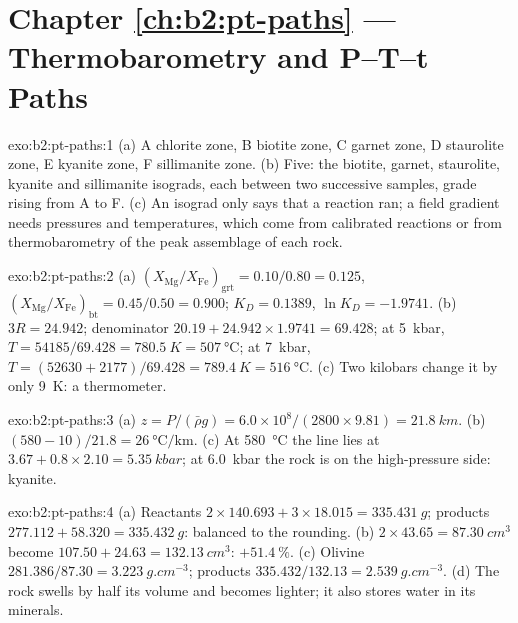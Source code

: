 \section*{Chapter \ref{ch:b2:pt-paths} --- Thermobarometry and P--T--t Paths}

\begin{solution}{exo:b2:pt-paths:1}
(a) A chlorite zone, B biotite zone, C garnet zone, D staurolite zone, E kyanite zone,
F sillimanite zone. (b) Five: the biotite, garnet, staurolite, kyanite and sillimanite
isograds, each between two successive samples, grade rising from A to F. (c) An isograd
only says that a reaction ran; a field gradient needs pressures and temperatures, which
come from calibrated reactions or from thermobarometry of the peak assemblage of each
rock.
\end{solution}

\begin{solution}{exo:b2:pt-paths:2}
(a) $(X_{\text{Mg}}/X_{\text{Fe}})_{\text{grt}} = 0.10/0.80 = 0.125$,
$(X_{\text{Mg}}/X_{\text{Fe}})_{\text{bt}} = 0.45/0.50 = 0.900$; $K_D = 0.1389$, $\ln K_D =
-1.9741$. (b) $3R = 24.942$; denominator $20.19 + 24.942\times1.9741 = 69.428$; at
\qty{5}{kbar}, $T = 54185/69.428 = \qty{780.5}{K} = \qty{507}{\celsius}$; at
\qty{7}{kbar}, $T = (52630 + 2177)/69.428 = \qty{789.4}{K} = \qty{516}{\celsius}$.
(c) Two kilobars change it by only \qty{9}{K}: a thermometer.
\end{solution}

\begin{solution}{exo:b2:pt-paths:3}
(a) $z = P/(\bar\rho g) = 6.0\times10^8/(2800\times9.81) = \qty{21.8}{km}$.
(b) $(580 - 10)/21.8 = \qty{26}{\celsius\per\km}$. (c) At \qty{580}{\celsius} the line
lies at $3.67 + 0.8\times2.10 = \qty{5.35}{kbar}$; at \qty{6.0}{kbar} the rock is on the
high-pressure side: kyanite.
\end{solution}

\begin{solution}{exo:b2:pt-paths:4}
(a) Reactants $2\times140.693 + 3\times18.015 = \qty{335.431}{g}$; products $277.112 +
58.320 = \qty{335.432}{g}$: balanced to the rounding. (b) $2\times43.65 =
\qty{87.30}{cm^3}$ become $107.50 + 24.63 = \qty{132.13}{cm^3}$: $+\qty{51.4}{\percent}$.
(c) Olivine $281.386/87.30 = \qty{3.223}{g.cm^{-3}}$; products $335.432/132.13 =
\qty{2.539}{g.cm^{-3}}$. (d) The rock swells by half its volume and becomes lighter; it
also stores water in its minerals.
\end{solution}

